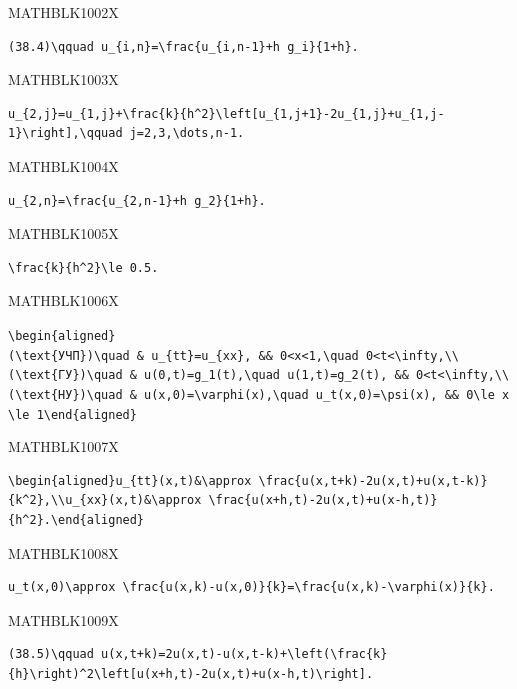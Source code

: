 \documentclass[
  ukrainian,
]{article}
\begin{document}
MATHBLK1002X

\begin{verbatim}
(38.4)\qquad u_{i,n}=\frac{u_{i,n-1}+h g_i}{1+h}.
\end{verbatim}

MATHBLK1003X

\begin{verbatim}
u_{2,j}=u_{1,j}+\frac{k}{h^2}\left[u_{1,j+1}-2u_{1,j}+u_{1,j-1}\right],\qquad j=2,3,\dots,n-1.
\end{verbatim}

MATHBLK1004X

\begin{verbatim}
u_{2,n}=\frac{u_{2,n-1}+h g_2}{1+h}.
\end{verbatim}

MATHBLK1005X

\begin{verbatim}
\frac{k}{h^2}\le 0.5.
\end{verbatim}

MATHBLK1006X

\texttt{\textbackslash{}begin\{aligned\}(\textbackslash{}text\{УЧП\})\textbackslash{}quad\ \&\ u\_\{tt\}=u\_\{xx\},\ \&\&\ 0\textless{}x\textless{}1,\textbackslash{}quad\ 0\textless{}t\textless{}\textbackslash{}infty,\textbackslash{}\textbackslash{}(\textbackslash{}text\{ГУ\})\textbackslash{}quad\ \&\ u(0,t)=g\_1(t),\textbackslash{}quad\ u(1,t)=g\_2(t),\ \&\&\ 0\textless{}t\textless{}\textbackslash{}infty,\textbackslash{}\textbackslash{}(\textbackslash{}text\{НУ\})\textbackslash{}quad\ \&\ u(x,0)=\textbackslash{}varphi(x),\textbackslash{}quad\ u\_t(x,0)=\textbackslash{}psi(x),\ \&\&\ 0\textbackslash{}le\ x\textbackslash{}le\ 1\textbackslash{}end\{aligned\}}

MATHBLK1007X

\begin{verbatim}
\begin{aligned}u_{tt}(x,t)&\approx \frac{u(x,t+k)-2u(x,t)+u(x,t-k)}{k^2},\\u_{xx}(x,t)&\approx \frac{u(x+h,t)-2u(x,t)+u(x-h,t)}{h^2}.\end{aligned}
\end{verbatim}

MATHBLK1008X

\begin{verbatim}
u_t(x,0)\approx \frac{u(x,k)-u(x,0)}{k}=\frac{u(x,k)-\varphi(x)}{k}.
\end{verbatim}

MATHBLK1009X

\begin{verbatim}
(38.5)\qquad u(x,t+k)=2u(x,t)-u(x,t-k)+\left(\frac{k}{h}\right)^2\left[u(x+h,t)-2u(x,t)+u(x-h,t)\right].
\end{verbatim}
\end{document}
